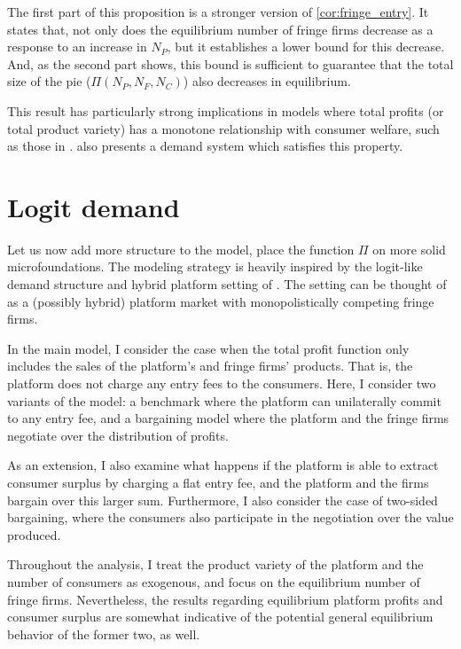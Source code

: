 \documentclass[a4paper]{article}
\begin{document}
The first part of this proposition is a stronger version of \cref{cor:fringe_entry}.
It states that, not only does the equilibrium number of fringe firms decrease as a response to an increase in $N_P$, but it establishes a lower bound for this decrease.
And, as the second part shows, this bound is sufficient to guarantee that the total size of the pie ($\Pi(N_P, N_F, N_C)$) also decreases in equilibrium.

This result has particularly strong implications in models where total profits (or total product variety) has a monotone relationship with consumer welfare, such as those in \textcite{anderson2020aggregative}.
 also presents a demand system which satisfies this property.


\section{Logit demand}
\label{sec:example}

Let us now add more structure to the model, place the function $\Pi$ on more solid microfoundations.
The modeling strategy is heavily inspired by the logit-like demand structure and hybrid platform setting of \textcite{anderson2021hybrid}.
The setting can be thought of as a (possibly hybrid) platform market with monopolistically competing fringe firms.

In the main model, I consider the case when the total profit function only includes the sales of the platform's and fringe firms' products.
That is, the platform does not charge any entry fees to the consumers.
Here, I consider two variants of the model: a benchmark where the platform can unilaterally commit to any entry fee, and a bargaining model where the platform and the fringe firms negotiate over the distribution of profits.

As an extension, I also examine what happens if the platform is able to extract consumer surplus by charging a flat entry fee, and the platform and the firms bargain over this larger sum.
Furthermore, I also consider the case of two-sided bargaining, where the consumers also participate in the negotiation over the value produced.

Throughout the analysis, I treat the product variety of the platform and the number of consumers as exogenous, and focus on the equilibrium number of fringe firms.
Nevertheless, the results regarding equilibrium platform profits and consumer surplus are somewhat indicative of the potential general equilibrium behavior of the former two, as well.
\end{document}
